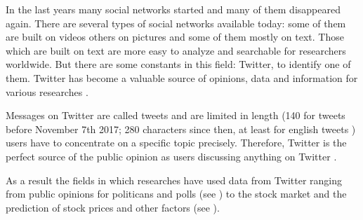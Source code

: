 In the last years many social networks started and many of them disappeared again.
There are several types of social networks available today: some of them are built on videos others on pictures and some of them mostly on text.
Those which are built on text are more easy to analyze and searchable for researchers worldwide.
But there are some constants in this field: Twitter, to identify one of them.
Twitter has become a valuable source of opinions, data and information for various researches \cite{Barbosa2010}.

Messages on Twitter are called tweets and are limited in length (140 for tweets before November 7th 2017; 280 characters since then, at least for english tweets \cite{Rosen2017}) users have to concentrate on a specific topic precisely.
Therefore, Twitter is the perfect source of the public opinion as users discussing anything on Twitter \cite{Pagolu2016a}.

As a result the fields in which researches have used data from Twitter ranging from public opinions for politicans and polls (see \cite{Oconnor2010a,Patodkar2016a}) to the stock market and the prediction of stock prices and other factors (see \cite{Bollen2011a,Mittal2012a,Nguyen2015a,Pagolu2016a,Zhang2011a}).

